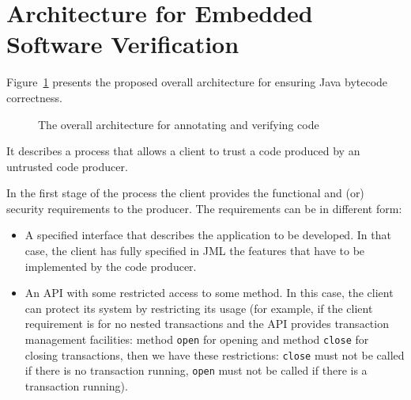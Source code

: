 \section{Architecture for Embedded Software Verification}
\label{architecture_s}	
Figure~\ref{architecture} presents the proposed overall architecture for ensuring Java bytecode correctness. 
\begin{figure}[ht!]
\begin{center}
\caption{The overall architecture for annotating and verifying code}
\label{architecture}
\end{center}
\end{figure}
It describes a process that allows a client to trust a code produced by an untrusted code producer.

In the first stage of the process the client provides the functional and (or) security requirements to the producer. The requirements can be in different form:
\begin{itemize}
\item A specified interface that describes the application to be developed. In that case, the client has fully specified in JML the features that have to be implemented by the code producer.
\item An API with some restricted access to some method. In this case, the client can protect its system by restricting its usage (for example, if the client requirement is for no nested transactions and the API provides transaction management facilities: method \texttt{open} for opening and method \texttt{close} for closing transactions, then we have these restrictions: \texttt{close} must not be called if there is no transaction running, \texttt{open} must not be called if there is a transaction running).   
\end{itemize}


